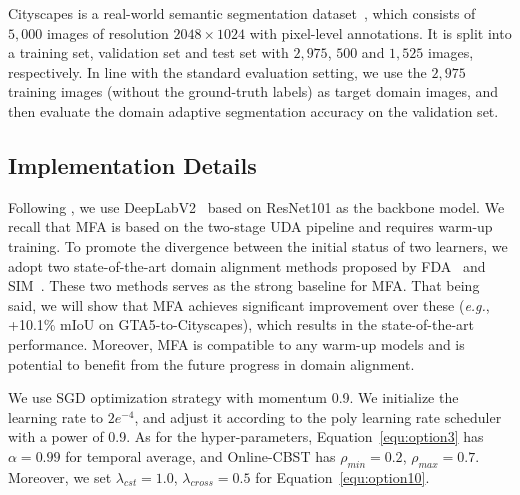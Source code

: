 \documentclass{bmvc2k}
\begin{document}
Cityscapes is a real-world semantic segmentation dataset~\cite{cordts2016cityscapes}, which consists of $5,000$ images of resolution $2048 \times 1024$ with pixel-level annotations. 
It is split into a training set, validation set and test set with $2,975$, $500$ and $1,525$ images, respectively. In line with the standard evaluation setting, we use the $2,975$ training images (without the ground-truth labels) as target domain images, and then evaluate the domain adaptive segmentation accuracy on the validation set. 

\subsection{Implementation Details} \label{section:architecture}
Following \cite{RN135,RN180}, we use DeepLabV2~\cite{chen2017deeplab} based on ResNet101 \cite{he2016deep} as the backbone model. We recall that MFA is based on the two-stage UDA pipeline and requires warm-up training. To promote the divergence between the initial status of two learners, we adopt two state-of-the-art domain alignment methods proposed by FDA~\cite{RN180} and SIM~\cite{RN135}. 
These two methods serves as the strong baseline for MFA. That being said, we will show that MFA achieves significant improvement over these (\emph{e.g.}, +10.1\% mIoU on GTA5-to-Cityscapes), which results in the state-of-the-art performance. Moreover, MFA is compatible to any warm-up models and is potential to benefit from the future progress in domain alignment. 

We use SGD optimization strategy with momentum 0.9. We initialize the learning rate to $2e^{-4}$, and adjust it according to the poly learning rate scheduler with a power of 0.9. As for the hyper-parameters, Equation~\ref{equ:option3} has $\alpha = 0.99$ for temporal average, and Online-CBST has $\rho_{min}=0.2$, $\rho_{max}=0.7$. Moreover, we set $\lambda_{cst}=1.0$, $\lambda_{cross}=0.5$ for Equation~\ref{equ:option10}.
\end{document}
